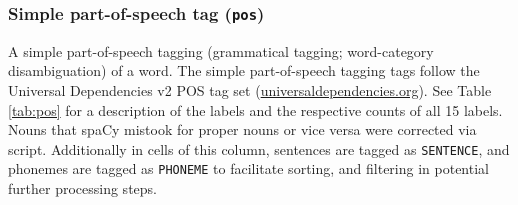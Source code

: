 \documentclass[10pt,a4paper,onecolumn]{article}
\begin{document}
\subsubsection*{Simple part-of-speech tag (\texttt{pos})}
A simple part-of-speech tagging (grammatical tagging; word-category disambiguation) of a word.
The simple part-of-speech tagging tags follow the Universal Dependencies v2 POS tag set (\href{https://universaldependencies.org}{universaldependencies.org}).
See Table \ref{tab:pos} for a description of the labels and the respective counts of all 15 labels.
Nouns that spaCy mistook for proper nouns or vice versa were corrected via script.
Additionally in cells of this column, sentences are tagged as \texttt{SENTENCE}, and phonemes are tagged as \texttt{PHONEME} to facilitate sorting, and filtering in potential further processing steps.
\end{document}
